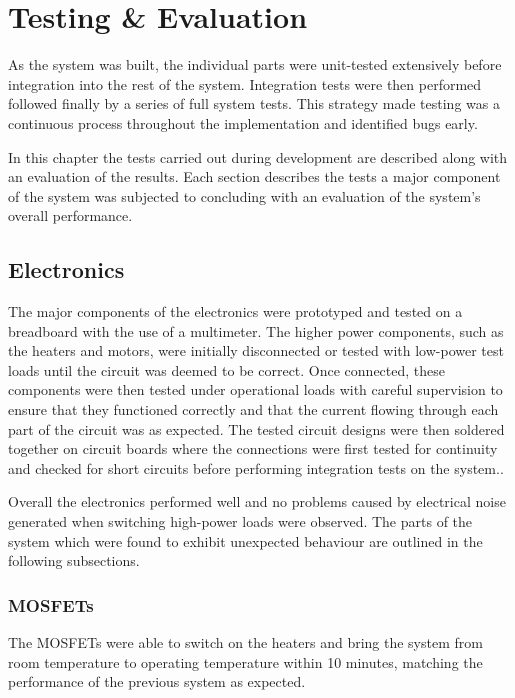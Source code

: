 \chapter{Testing \& Evaluation}
	
	\label{sec:testing}
	
	As the system was built, the individual parts were unit-tested extensively
	before integration into the rest of the system. Integration tests were then
	performed followed finally by a series of full system tests. This strategy
	made testing was a continuous process throughout the implementation and
	identified bugs early.
	
	In this chapter the tests carried out during development are described along
	with an evaluation of the results. Each section describes the tests a major
	component of the system was subjected to concluding with an evaluation of the
	system's overall performance.
	
	\section{Electronics}
		
		The major components of the electronics were prototyped and tested on a
		breadboard with the use of a multimeter. The higher power components, such
		as the heaters and motors, were initially disconnected or tested with
		low-power test loads until the circuit was deemed to be correct. Once
		connected, these components were then tested under operational loads with
		careful supervision to ensure that they functioned correctly and that the
		current flowing through each part of the circuit was as expected. The tested
		circuit designs were then soldered together on circuit boards where the
		connections were first tested for continuity and checked for short circuits
		before performing integration tests on the system..
		
		Overall the electronics performed well and no problems caused by electrical
		noise generated when switching high-power loads were observed. The parts of
		the system which were found to exhibit unexpected behaviour are outlined in
		the following subsections.
		
		\subsection{MOSFETs}
			
			The MOSFETs were able to switch on the heaters and bring the system from
			room temperature to operating temperature within 10 minutes, matching the
			performance of the previous system as expected.
			
